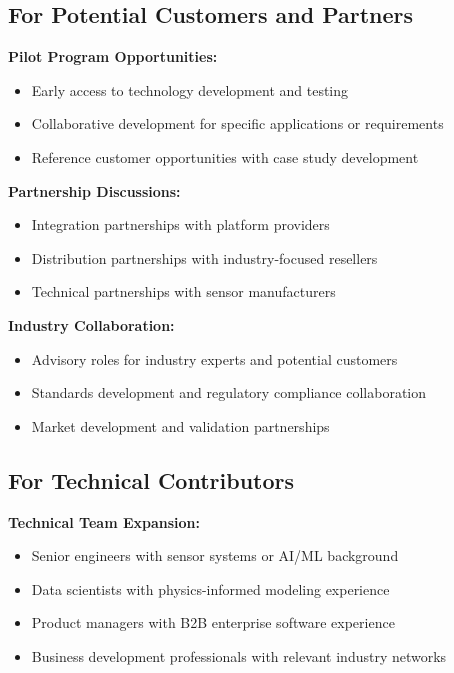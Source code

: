 \documentclass[11pt,letterpaper]{article}
\begin{document}
\subsection*{For Potential Customers and Partners}

\textbf{Pilot Program Opportunities:}
\begin{itemize}[leftmargin=10pt, itemsep=1pt]
    \item Early access to technology development and testing
    \item Collaborative development for specific applications or requirements
    \item Reference customer opportunities with case study development
\end{itemize}

\textbf{Partnership Discussions:}
\begin{itemize}[leftmargin=10pt, itemsep=1pt]
    \item Integration partnerships with platform providers
    \item Distribution partnerships with industry-focused resellers
    \item Technical partnerships with sensor manufacturers
\end{itemize}

\textbf{Industry Collaboration:}
\begin{itemize}[leftmargin=10pt, itemsep=1pt]
    \item Advisory roles for industry experts and potential customers
    \item Standards development and regulatory compliance collaboration
    \item Market development and validation partnerships
\end{itemize}

\subsection*{For Technical Contributors}

\textbf{Technical Team Expansion:}
\begin{itemize}[leftmargin=10pt, itemsep=1pt]
    \item Senior engineers with sensor systems or AI/ML background
    \item Data scientists with physics-informed modeling experience
    \item Product managers with B2B enterprise software experience
    \item Business development professionals with relevant industry networks
\end{itemize}
\end{document}
